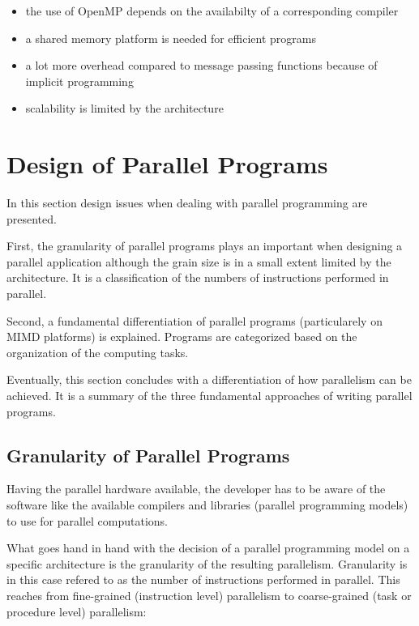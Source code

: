 \begin{itemize}
\item the use of OpenMP depends on the availabilty of a corresponding
  compiler
\item a shared memory platform is needed for efficient programs
\item a lot more overhead compared to message passing functions because
  of implicit programming
\item scalability is limited by the architecture
\end{itemize}

\section{Design of Parallel Programs}

In this section design issues when dealing with parallel programming
are presented.

First, the granularity of parallel programs plays an important when
designing a parallel application although the grain size is in a small
extent limited by the architecture. It is a classification of the
numbers of instructions performed in parallel.

Second, a fundamental differentiation of parallel programs
(particularely on MIMD platforms) is explained. Programs are
categorized based on the organization of the computing tasks.

Eventually, this section concludes with a differentiation of how
parallelism can be achieved. It is a summary of the three fundamental
approaches of writing parallel programs.

\subsection{Granularity of Parallel Programs}

Having the parallel hardware available, the developer has to be aware
of the software like the available compilers and
libraries (parallel programming models) to use for parallel
computations.

What goes hand in hand with the decision of a parallel programming
model on a specific architecture is the granularity of the resulting
parallelism. Granularity is in this case refered to as the
number of instructions performed in parallel. This reaches from
fine-grained (instruction level) parallelism to coarse-grained (task
or procedure level) parallelism:
 
